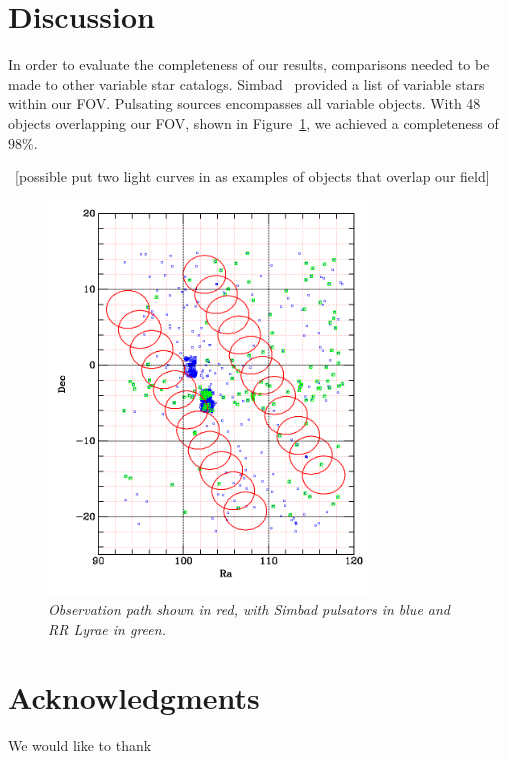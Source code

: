 \documentclass[aps,prb,twocolumn,superscriptaddress]{revtex4-1}
\begin{document}
\section{Discussion}


In order to evaluate the completeness of our results, comparisons needed to be made to other variable star catalogs.  Simbad~\cite{simbad} provided a list of variable stars within our FOV.  Pulsating sources encompasses all variable objects.  With 48 objects overlapping our FOV, shown in Figure~\ref{fig:simoverlap}, we achieved a completeness of $98\%$.

~[possible put two light curves in as examples of objects that overlap our field]\\

\begin{figure}[H]
 \centering
 	\includegraphics[width=3.35in]{figures/simbadoverlap.png}
 \caption{\it \small{Observation path shown in red, with Simbad pulsators in blue and RR Lyrae in green.}}
 \label{fig:simoverlap}
\end{figure}





\section*{Acknowledgments}
We would like to thank   %
\end{document}
